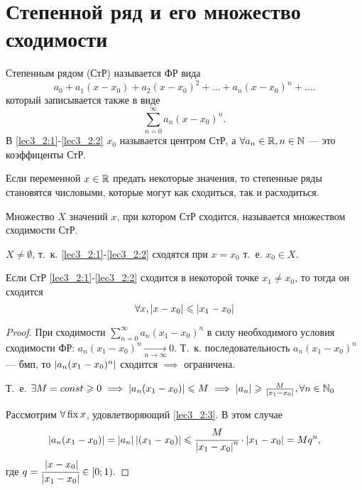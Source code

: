 \documentclass[../../main.tex]{subfiles}
\begin{document}
\section{Степенной ряд и его множество сходимости}

Степенным рядом (СтР) называется ФР вида
\begin{equation}\label{lec3_2:1}
a_0+a_1(x-x_0)+a_2(x-x_0)^2+\dots+a_n(x-x_0)^n+\dots.
\end{equation}
который записывается также в виде
\begin{equation}\label{lec3_2:2}
\sum_{n=0}^{\infty}a_n(x-x_0)^n.
\end{equation}
В \ref{lec3_2:1}-\ref{lec3_2:2} $x_0$ называется центром СтР, 
а $\forall a_n \in \mathbb{R}, n\in \mathbb{N}$ --- это коэффиценты СтР.

Если переменной $x\in\mathbb{R}$ предать некоторые значения, 
то степенные ряды становятся числовыми, которые могут как сходиться, 
так и расходиться.

Множество $X$ значений $x$, при котором СтР сходится, 
называется множеством сходимости СтР. 

$X \neq \emptyset$, т.~к. \ref{lec3_2:1}-\ref{lec3_2:2} 
сходятся при $x=x_0$ т.~е. $x_0\in X$.

\begin{lem}
	Если СтР \ref{lec3_2:1}-\ref{lec3_2:2} сходится в некоторой 
	точке $x_1\neq x_0$, то тогда он сходится 
	\begin{equation}\label{lec3_2:3}
		\forall x, \left|{ x - x_0}\right| \leqslant \left|{x_1 - x_0}\right|
	\end{equation}
\end{lem}
\begin{proof}
	При сходимости $\sum_{n=0}^{\infty}a_n(x_1-x_0)^n$ в силу необходимого
	 условия сходимости ФР: $a_n(x_1-x_0)^n\underset{n\to\infty}{\rightarrow}0$. 
	Т.~к. последовательность $a_n(x_1-x_0)^n$ --- бмп, 
	то $\left|{a_n(x_1-x_0)^n}\right|$ сходится $\implies$ ограничена.
	
	Т.~е. $\exists M=const \geqslant0 \implies \left|{a_n(x_1-x_0)}\right| \leqslant M
	\implies \left|{a_n}\right|\geqslant \frac{M}{\left|{x_1-x_0}\right|}, \forall n\in\mathbb{N}_0$
	
	Рассмотрим $\forall \operatorname{fix} x $, удовлетворяющий \ref{lec3_2:3}. 
	В этом случае  
	\begin{equation*}
		\left|{a_n(x_1-x_0)}\right| = \left|{a_n}\right|\left|{(x_1-x_0)}\right|\leqslant \cfrac{M}{\left|{x_1-x_0}\right|^n}\cdot \left|{x_1-x_0}\right|=Mq^n,
	\end{equation*}
	где $q=\cfrac{\left|{x-x_0}\right|}{\left|{x_1-x_0}\right|}\in{\left[0;1\right)}.$
\end{proof}	
\end{document}
